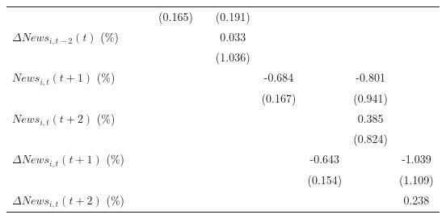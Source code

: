 {\begin{tabular}{l*{9}{c}}
                    &                     &                     &     (0.165)         &                     &     (0.191)         &                     &                     &                     &                     \\
\addlinespace
$ \Delta News_{i,t-2}(t)$ (\%)&                     &                     &                     &                     &       0.033         &                     &                     &                     &                     \\
                    &                     &                     &                     &                     &     (1.036)         &                     &                     &                     &                     \\
\addlinespace
$ News_{i,t}(t+1)$ (\%)&                     &                     &                     &                     &                     &      -0.684\sym{***}&                     &      -0.801         &                     \\
                    &                     &                     &                     &                     &                     &     (0.167)         &                     &     (0.941)         &                     \\
\addlinespace
$ News_{i,t}(t+2)$ (\%)&                     &                     &                     &                     &                     &                     &                     &       0.385         &                     \\
                    &                     &                     &                     &                     &                     &                     &                     &     (0.824)         &                     \\
\addlinespace
$ \Delta News_{i,t}(t+1)$ (\%)&                     &                     &                     &                     &                     &                     &      -0.643\sym{***}&                     &      -1.039         \\
                    &                     &                     &                     &                     &                     &                     &     (0.154)         &                     &     (1.109)         \\
\addlinespace
$ \Delta News_{i,t}(t+2)$ (\%)&                     &                     &                     &                     &                     &                     &                     &                     &       0.238         \\

\end{tabular}}
